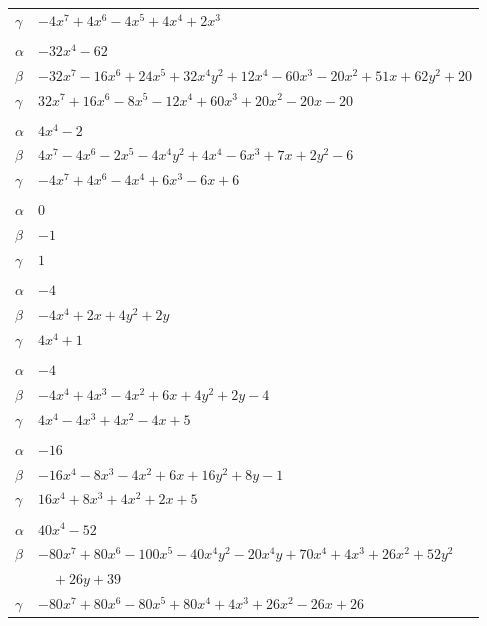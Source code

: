 \documentclass[11pt]{article}
\begin{document}
\begin{longtable}{@{}ll@{}}
$\gamma$ & $-4x^{7}+4x^{6}-4x^{5}+4x^{4}+2x^{3}$\\
\addlinespace[3pt]
\multicolumn{2}{@{}l}{$\{i,j\}=\{0,31\}$, $k_{ij}=2\cdot 3\cdot 7$}\\
$\alpha$ & $-32x^{4}-62$\\
$\beta$ & $-32x^{7}-16x^{6}+24x^{5}+32x^{4}y^{2}+12x^{4}-60x^{3}-20x^{2}+51x+62y^{2}+20$\\
$\gamma$ & $32x^{7}+16x^{6}-8x^{5}-12x^{4}+60x^{3}+20x^{2}-20x-20$\\
\addlinespace[3pt]
\multicolumn{2}{@{}l}{$\{i,j\}=\{0,35\}$, $k_{ij}=2\cdot 7$}\\
$\alpha$ & $4x^{4}-2$\\
$\beta$ & $4x^{7}-4x^{6}-2x^{5}-4x^{4}y^{2}+4x^{4}-6x^{3}+7x+2y^{2}-6$\\
$\gamma$ & $-4x^{7}+4x^{6}-4x^{4}+6x^{3}-6x+6$\\
\addlinespace[3pt]
\multicolumn{2}{@{}l}{$\{i,j\}=\{1,5\}$, $k_{ij}=3$}\\
$\alpha$ & $0$\\
$\beta$ & $-1$\\
$\gamma$ & $1$\\
\addlinespace[3pt]
\multicolumn{2}{@{}l}{$\{i,j\}=\{1,9\}$, $k_{ij}=3$}\\
$\alpha$ & $-4$\\
$\beta$ & $-4x^{4}+2x+4y^{2}+2y$\\
$\gamma$ & $4x^{4}+1$\\
\addlinespace[3pt]
\multicolumn{2}{@{}l}{$\{i,j\}=\{1,10\}$, $k_{ij}=13$}\\
$\alpha$ & $-4$\\
$\beta$ & $-4x^{4}+4x^{3}-4x^{2}+6x+4y^{2}+2y-4$\\
$\gamma$ & $4x^{4}-4x^{3}+4x^{2}-4x+5$\\
\addlinespace[3pt]
\multicolumn{2}{@{}l}{$\{i,j\}=\{1,12\}$, $k_{ij}=7$}\\
$\alpha$ & $-16$\\
$\beta$ & $-16x^{4}-8x^{3}-4x^{2}+6x+16y^{2}+8y-1$\\
$\gamma$ & $16x^{4}+8x^{3}+4x^{2}+2x+5$\\
\addlinespace[3pt]
\multicolumn{2}{@{}l}{$\{i,j\}=\{1,18\}$, $k_{ij}=3\cdot 13$}\\
$\alpha$ & $40x^{4}-52$\\
$\beta$ & $-80x^{7}+80x^{6}-100x^{5}-40x^{4}y^{2}-20x^{4}y+70x^{4}+4x^{3}+26x^{2}+52y^{2}$\\
 & $\quad +26y+39$\\
$\gamma$ & $-80x^{7}+80x^{6}-80x^{5}+80x^{4}+4x^{3}+26x^{2}-26x+26$\\

\end{longtable}
\end{document}
